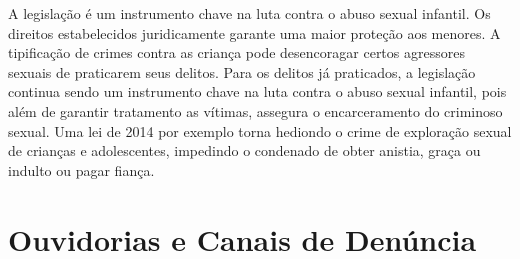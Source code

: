 
A legislação é um instrumento chave na luta contra o abuso sexual infantil. Os direitos estabelecidos juridicamente garante uma maior proteção aos menores. A tipificação de crimes contra as criança pode desencoragar certos agressores sexuais de praticarem seus delitos. Para os delitos já praticados, a legislação continua sendo um instrumento chave na luta contra o abuso sexual infantil, pois além de garantir tratamento as vítimas, assegura o encarceramento do criminoso sexual. Uma lei de 2014 por exemplo %
torna hediondo o crime de exploração sexual de crianças e adolescentes, impedindo o condenado de obter anistia, graça ou indulto ou pagar fiança.


\section{Ouvidorias e Canais de Denúncia}\label{sec:canais}



